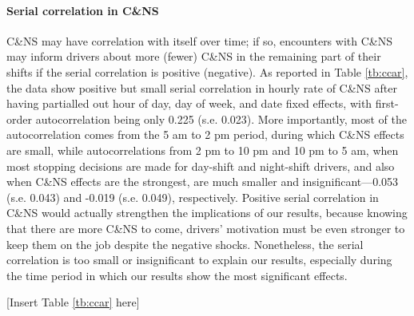 \documentclass[reviewmode]{restat}
\begin{document}
\paragraph{Serial correlation in C\&NS} C\&NS may have correlation with itself over time; if so, encounters
with C\&NS may inform drivers about more (fewer) C\&NS in the remaining part of their shifts if the serial 
correlation is positive (negative). As reported in Table \ref{tb:ccar}, the data show positive but small 
serial correlation in hourly rate of C\&NS after having partialled out hour of day, day of week, and date 
fixed effects, with first-order autocorrelation being only 0.225 (s.e. 0.023). More importantly, most of 
the autocorrelation comes from the 5 am to 2 pm period, during which C\&NS effects are small, while 
autocorrelations from 2 pm to 10 pm and 10 pm to 5 am, when most stopping decisions are made for day-shift
and night-shift drivers, and also when C\&NS effects are the strongest, are much smaller and insignificant---0.053
(s.e. 0.043) and -0.019 (s.e. 0.049), respectively. Positive serial correlation in C\&NS would actually strengthen
the implications of our results, because knowing that there are more C\&NS to come, drivers' motivation must 
be even stronger to keep them on the job despite the negative shocks. Nonetheless, the serial correlation is
too small or insignificant to explain our results, especially during the time period in which our results 
show the most significant effects.

\begin{center}
    [Insert Table \ref{tb:ccar} here]
\end{center}
\end{document}
